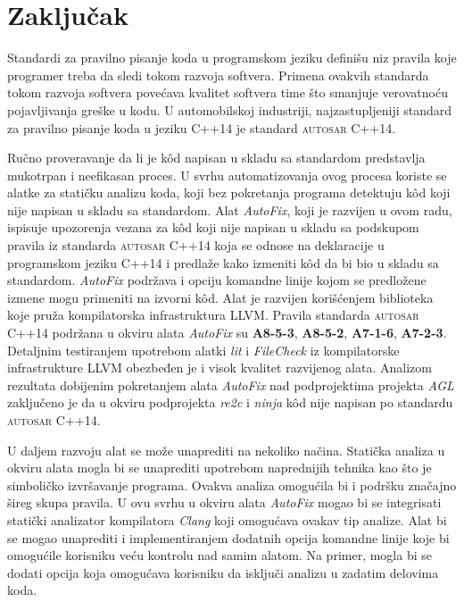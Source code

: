 \documentclass[12pt,oneside]{memoir}
\begin{document}



\chapter{Zaključak}

Standardi za pravilno pisanje koda u programskom jeziku defini\v{s}u niz pravila koje programer treba da sledi tokom razvoja softvera. Primena ovakvih standarda
tokom razvoja softvera pove\'{c}ava kvalitet softvera time \v{s}to smanjuje verovatno\'{c}u pojavljivanja gre\v{s}ke u kodu. U automobilskoj industriji,
najzastupljeniji standard za pravilno pisanje koda u jeziku C++14 je standard \textsc{autosar} C++14.
\par
Ru\v{c}no proveravanje da li je k\^{o}d napisan u skladu sa standardom predstavlja mukotrpan i neefikasan proces. U svrhu automatizovanja ovog procesa
koriste se alatke za stati\v{c}ku analizu koda, koji bez pokretanja programa detektuju k\^{o}d koji nije napisan u skladu sa standardom. Alat \textit{AutoFix}, koji je razvijen u ovom radu, ispisuje upozorenja vezana za k\^{o}d koji nije napisan u skladu sa podskupom pravila iz standarda \textsc{autosar} C++14 koja se odnose na deklaracije u programskom jeziku C++14 i predla\v{z}e kako izmeniti k\^{o}d da bi bio u skladu sa standardom. \textit{AutoFix} podr\v{z}ava i opciju komandne linije kojom se predlo\v{z}ene izmene mogu primeniti na izvorni k\^{o}d. Alat je razvijen kori\v{s}\'{c}enjem biblioteka koje pru\v{z}a kompilatorska infrastruktura LLVM. Pravila standarda \textsc{autosar} C++14 podr\v{z}ana u okviru alata \textit{AutoFix} su \textbf{A8-5-3}, \textbf{A8-5-2}, \textbf{A7-1-6}, \textbf{A7-2-3}. Detaljnim testiranjem upotrebom alatki \textit{lit} i \textit{FileCheck} iz kompilatorske infrastrukture LLVM obezbeđen je i visok kvalitet razvijenog alata. Analizom rezultata dobijenim pokretanjem alata \textit{AutoFix} nad podprojektima projekta \textit{AGL} zaklju\v{c}eno je da u okviru podprojekta \textit{re2c} i \textit{ninja} k\^{o}d nije napisan po standardu \textsc{autosar} C++14.

\par
U daljem razvoju alat se mo\v{z}e unaprediti na nekoliko na\v{c}ina. 
Stati\v{c}ka analiza u okviru alata mogla bi se unaprediti upotrebom naprednijih tehnika kao \v{s}to je simboli\v{c}ko izvr\v{s}avanje programa. Ovakva analiza
omogu\'{c}ila bi i podr\v{s}ku zna\v{c}ajno \v{s}ireg skupa pravila. U ovu svrhu u okviru alata \textit{AutoFix} mogao bi se integrisati stati\v{c}ki analizator kompilatora \textit{Clang} koji omogu\'{c}ava ovakav tip analize. Alat bi se mogao unaprediti i implementiranjem dodatnih opcija komandne linije koje bi omogu\'{c}ile korisniku ve\'{c}u
kontrolu nad samim alatom. Na primer, mogla bi se dodati opcija koja omogu\'{c}ava korisniku da isklju\v{c}i analizu u zadatim delovima koda.
\end{document}
